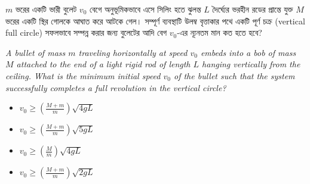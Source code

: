 \documentclass[12pt, a4paper]{article}
\begin{document}
\begin{tcolorbox}[questionbox={প্রশ্ন (Question) 36}]
    \noindent
    $m$ ভরের একটি ভারী বুলেট $v_0$ বেগে অনুভূমিকভাবে এসে সিলিং হতে ঝুলন্ত $L$ দৈর্ঘ্যের ভরহীন রডের প্রান্তে যুক্ত $M$ ভরের একটি স্থির গোলকে আঘাত করে আটকে গেল। সম্পূর্ণ ব্যবস্থাটি উলম্ব বৃত্তাকার পথে একটি পূর্ণ চক্র (vertical full circle) সফলভাবে সম্পন্ন করার জন্য বুলেটের আদি বেগ $v_0$-এর ন্যূনতম মান কত হতে হবে?
    
    \vspace{0.8em}
    \begin{english}
    \noindent\textit{\color{darkgray}
    A bullet of mass $m$ traveling horizontally at speed $v_0$ embeds into a bob of mass $M$ attached to the end of a light rigid rod of length $L$ hanging vertically from the ceiling. What is the minimum initial speed $v_0$ of the bullet such that the system successfully completes a full revolution in the vertical circle?
    }
    \end{english}
\end{tcolorbox}

\vspace{1em}
\begin{center}
\end{center}
\vspace{1em}

\begin{itemize}[label={}, leftmargin=1cm, itemsep=0.5em]
    \item[\textbf{A)}] $v_0 \ge \left(\frac{M + m}{m}\right) \sqrt{4 g L}$
    \item[\textbf{B)}] $v_0 \ge \left(\frac{M + m}{m}\right) \sqrt{5 g L}$
    \item[\textbf{C)}] $v_0 \ge \left(\frac{M}{m}\right) \sqrt{4 g L}$
    \item[\textbf{D)}] $v_0 \ge \left(\frac{M + m}{m}\right) \sqrt{2 g L}$
\end{itemize}
\end{document}
